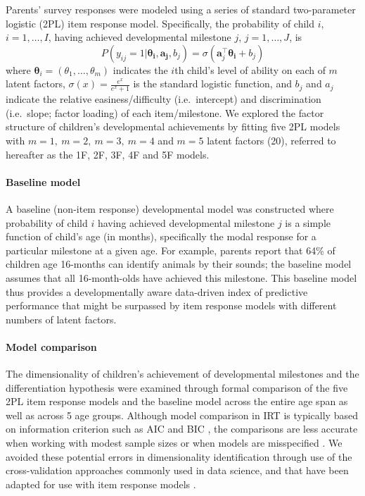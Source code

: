 \documentclass[man, floatsintext]{apa7}
\begin{document}
Parents' survey responses were modeled using a series of standard two-parameter logistic (2PL) item response model. Specifically, the probability of child $i$, $i = 1, \ldots, I$, having achieved developmental milestone $j$, $j = 1, \ldots, J$, is \begin{equation}\label{eq:irt}
P(y_{ij} = 1 | \boldsymbol{\theta_i}, \boldsymbol{a_j}, b_j) = \sigma(\boldsymbol{a}_{j}^{\top}\boldsymbol{\theta_i} + b_j)
\end{equation} where $\boldsymbol{\theta}_{i}=(\theta_1, \dots, \theta_m)$ indicates the $i$th child's level of ability on each of $m$ latent factors, $\sigma(x) = \frac{e^x}{e^x + 1}$ is the standard logistic function, and $b_j$ and $a_j$ indicate the relative easiness/difficulty (i.e.~intercept) and discrimination (i.e.~slope; factor loading) of each item/milestone. 
We explored the factor structure of children's developmental achievements by fitting five 2PL models with $m = 1, \ m = 2, \ m = 3, \ m = 4$ and $m = 5$ latent factors (20), referred to hereafter as the 1F, 2F, 3F, 4F and 5F models. 


\paragraph{Baseline model}
A baseline (non-item response) developmental model was constructed where probability of child $i$ having achieved developmental milestone $j$ is a simple function of child's age (in
months), specifically the modal response for a particular milestone at a given age. For example, parents report that 64\% of children age 16-months can identify animals by their sounds; the baseline model assumes that all 16-month-olds have achieved this milestone. This baseline model thus provides a developmentally aware data-driven index of predictive performance that might be surpassed by item response models with different numbers of latent factors.

\paragraph{Model comparison}

The dimensionality of children's achievement of developmental milestones and the differentiation hypothesis were examined through formal comparison of the five 2PL item response models and the baseline model across the entire age span as well as across 5 age groups. Although model comparison in IRT is typically based on information criterion such as AIC and BIC \parencite{maydeu-olivares2013}, the comparisons are less accurate when working with modest sample sizes or when models are misspeciﬁed \parencite{mcdonald1995}. We avoided these potential errors in dimensionality identification through use of the cross-validation approaches commonly used in data science, and that have been adapted for use with item response models \parencite{bergner2012}. 
\end{document}
